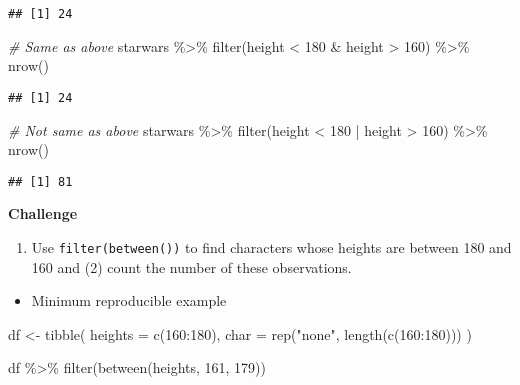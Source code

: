 \documentclass[
]{book}
\newenvironment{Shaded}{\begin{snugshade}}{\end{snugshade}}
\newcommand{\AttributeTok}[1]{\textcolor[rgb]{0.77,0.63,0.00}{#1}}
\newcommand{\CommentTok}[1]{\textcolor[rgb]{0.56,0.35,0.01}{\textit{#1}}}
\newcommand{\DecValTok}[1]{\textcolor[rgb]{0.00,0.00,0.81}{#1}}
\newcommand{\FunctionTok}[1]{\textcolor[rgb]{0.00,0.00,0.00}{#1}}
\newcommand{\NormalTok}[1]{#1}
\newcommand{\OtherTok}[1]{\textcolor[rgb]{0.56,0.35,0.01}{#1}}
\newcommand{\SpecialCharTok}[1]{\textcolor[rgb]{0.00,0.00,0.00}{#1}}
\newcommand{\StringTok}[1]{\textcolor[rgb]{0.31,0.60,0.02}{#1}}
\providecommand{\tightlist}{%
  \setlength{\itemsep}{0pt}\setlength{\parskip}{0pt}}
\begin{document}
\begin{verbatim}
## [1] 24
\end{verbatim}

\begin{Shaded}
\begin{Highlighting}[]
\CommentTok{\# Same as above}
\NormalTok{starwars }\SpecialCharTok{\%\textgreater{}\%}
  \FunctionTok{filter}\NormalTok{(height }\SpecialCharTok{\textless{}} \DecValTok{180} \SpecialCharTok{\&}\NormalTok{ height }\SpecialCharTok{\textgreater{}} \DecValTok{160}\NormalTok{) }\SpecialCharTok{\%\textgreater{}\%}
  \FunctionTok{nrow}\NormalTok{()}
\end{Highlighting}
\end{Shaded}

\begin{verbatim}
## [1] 24
\end{verbatim}

\begin{Shaded}
\begin{Highlighting}[]
\CommentTok{\# Not same as above}
\NormalTok{starwars }\SpecialCharTok{\%\textgreater{}\%}
  \FunctionTok{filter}\NormalTok{(height }\SpecialCharTok{\textless{}} \DecValTok{180} \SpecialCharTok{|}\NormalTok{ height }\SpecialCharTok{\textgreater{}} \DecValTok{160}\NormalTok{) }\SpecialCharTok{\%\textgreater{}\%}
  \FunctionTok{nrow}\NormalTok{()}
\end{Highlighting}
\end{Shaded}

\begin{verbatim}
## [1] 81
\end{verbatim}

\textbf{Challenge}

\begin{enumerate}
\def\labelenumi{(\arabic{enumi})}
\tightlist
\item
  Use \texttt{filter(between())} to find characters whose heights are between 180 and 160 and (2) count the number of these observations.
\end{enumerate}

\begin{itemize}
\tightlist
\item
  Minimum reproducible example
\end{itemize}

\begin{Shaded}
\begin{Highlighting}[]
\NormalTok{df }\OtherTok{\textless{}{-}} \FunctionTok{tibble}\NormalTok{(}
  \AttributeTok{heights =} \FunctionTok{c}\NormalTok{(}\DecValTok{160}\SpecialCharTok{:}\DecValTok{180}\NormalTok{),}
  \AttributeTok{char =} \FunctionTok{rep}\NormalTok{(}\StringTok{"none"}\NormalTok{, }\FunctionTok{length}\NormalTok{(}\FunctionTok{c}\NormalTok{(}\DecValTok{160}\SpecialCharTok{:}\DecValTok{180}\NormalTok{)))}
\NormalTok{)}

\NormalTok{df }\SpecialCharTok{\%\textgreater{}\%}
  \FunctionTok{filter}\NormalTok{(}\FunctionTok{between}\NormalTok{(heights, }\DecValTok{161}\NormalTok{, }\DecValTok{179}\NormalTok{))}
\end{Highlighting}
\end{Shaded}
\end{document}
